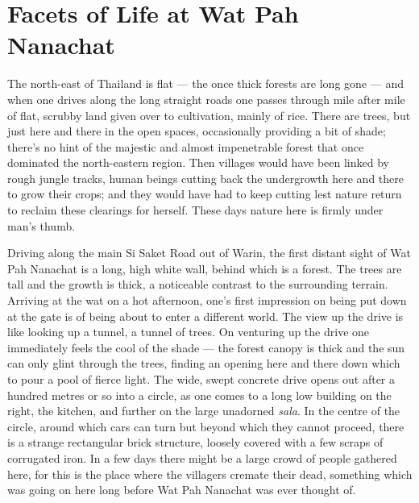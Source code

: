 

\chapter{Facets of Life at Wat Pah Nanachat}
\markright{\chapterAuthor}

The north-east of Thailand is flat --- the once thick forests are long
gone --- and when one drives along the long straight roads one passes
through mile after mile of flat, scrubby land given over to cultivation,
mainly of rice. There are trees, but just here and there in the open
spaces, occasionally providing a bit of shade; there's no hint of the
majestic and almost impenetrable forest that once dominated the
north-eastern region. Then villages would have been linked by rough
jungle tracks, human beings cutting back the undergrowth here and there
to grow their crops; and they would have had to keep cutting lest nature
return to reclaim these clearings for herself. These days nature here is
firmly under man's thumb.

Driving along the main Si Saket Road out of Warin, the first distant
sight of Wat Pah Nanachat is a long, high white wall, behind which is a
forest. The trees are tall and the growth is thick, a noticeable
contrast to the surrounding terrain. Arriving at the wat on a hot
afternoon, one's first impression on being put down at the gate is of
being about to enter a different world. The view up the drive is like
looking up a tunnel, a tunnel of trees. On venturing up the drive one
immediately feels the cool of the shade --- the forest canopy is thick
and the sun can only glint through the trees, finding an opening here
and there down which to pour a pool of fierce light. The wide, swept
concrete drive opens out after a hundred metres or so into a circle, as
one comes to a long low building on the right, the kitchen, and further
on the large unadorned \emph{sala}. In the centre of the circle, around
which cars can turn but beyond which they cannot proceed, there is a
strange rectangular brick structure, loosely covered with a few scraps
of corrugated iron. In a few days there might be a large crowd of people
gathered here, for this is the place where the villagers cremate their
dead, something which was going on here long before Wat Pah Nanachat was
ever thought of.


